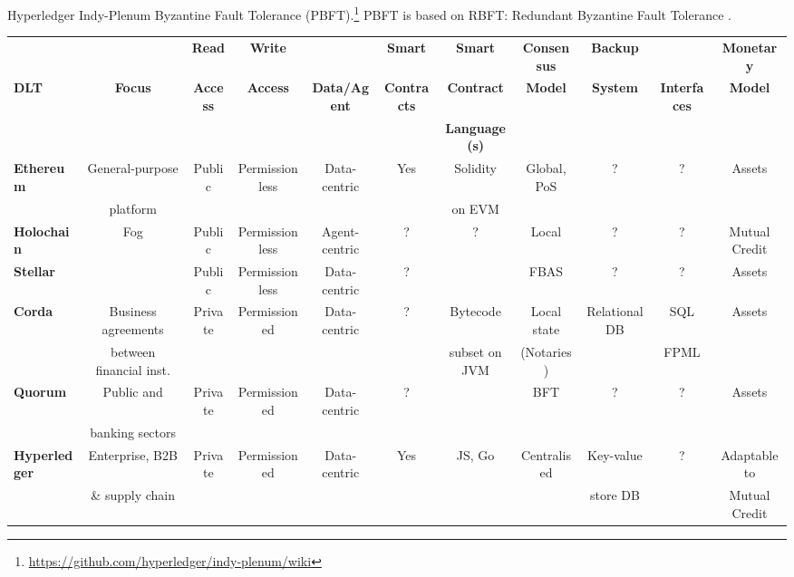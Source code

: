 Hyperledger Indy-Plenum Byzantine Fault Tolerance (PBFT).\footnote{\url{https://github.com/hyperledger/indy-plenum/wiki}} PBFT is based on RBFT: Redundant Byzantine Fault Tolerance
\cite{Aublinetal2013}.











\begin{table}
\small
\begin{centering}
{\begin{tabular}{| l | c | c | c | c | c | c | c | c | c | c |}
\hline
				& 				& \textbf{Read}			& \textbf{Write}		& \textbf{} 
				& \textbf{Smart}		& \textbf{Smart}			&\textbf{Consensus}
				& \textbf{Backup} 	& \textbf{}				&\textbf{Monetary} \\
\textbf{DLT}		&\textbf{Focus}  	& \textbf{Access} 		& \textbf{Access}	& \textbf{Data/Agent} 
				& \textbf{Contracts} 	& \textbf{Contract}		&\textbf{Model} 
				& \textbf{System} 	& \textbf{Interfaces}		&\textbf{Model} \\
				& 				& \textbf{} 				& \textbf{} 			& \textbf{} 
				& \textbf{} 			& \textbf{Language(s)}	&\textbf{} 
				& \textbf{} 			& \textbf{}				&\textbf{} \\
\hline
\hline
\textbf{Ethereum}	&General-purpose		&Public		&Permissionless	&Data-centric	&Yes		&Solidity	
				&Global, PoS 			&?			&?				&Assets \\
				&platform 				&			&				&			&		&on EVM	
				& 					&			&				& \\
\hline
\textbf{Holochain}	&Fog 				&Public		&Permissionless	&Agent-centric	&?		&?
				&Local 				&?			&?				&Mutual Credit\\
\hline
\textbf{Stellar}		& 					&Public		&Permissionless	&Data-centric	&?		&
				&FBAS 				&?			&?				&Assets\\
\hline
\textbf{Corda} 		&Business agreements	&Private		&Permissioned		&Data-centric	&?		&Bytecode
				&Local state			&Relational DB	&SQL			&Assets\\
		 		&between financial inst.	&			&				&			&		&subset on JVM
				&(Notaries)			&			&FPML			&\\
\hline
\textbf{Quorum} 	&Public and  			&Private		&Permissioned		&Data-centric	&?		&
				&BFT 				&?			&?				&Assets\\
			 	&banking sectors		&			&				&			&		&
				& 					&			&				&\\
\hline
\textbf{Hyperledger}	&Enterprise, B2B		&Private		&Permissioned		&Data-centric	&Yes		&JS, Go
				&Centralised 			&Key-value	&?				&Adaptable to\\
 				& \& supply chain		&			&				&			&		&
				& 					&store DB		&				&Mutual Credit\\
\hline
\end{tabular}}


\end{centering}
\end{table}
